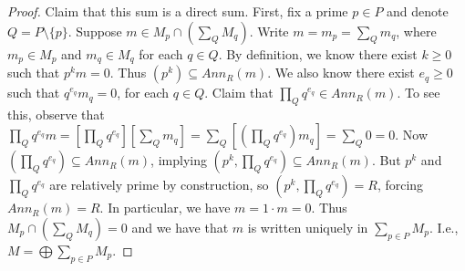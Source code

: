 \documentclass[8pt]{amsart}
\theoremstyle{plain}%
\theoremstyle{definition}
\theoremstyle{remark}
\numberwithin{equation}{section}
\begin{document}
\begin{enumerate}
\begin{proof}
		Claim that this sum is a direct sum. First, fix a prime $p\in P$ and denote $Q = P \setminus \{p\}$. Suppose $m \in M_{p} \cap (\sum_Q M_q)$. Write $m = m_{p} = \sum_Qm_q$, where $m_{p} \in M_{p}$ and $m_q \in M_q$ for each $q \in Q$. By definition, we know there exist $k \geq 0$ such that $p^km = 0$. Thus $(p^k) \subseteq Ann_R(m)$. We also know there exist $e_q \geq 0$ such that $q^{e_q}m_q = 0$, for each $q \in Q$. Claim that $\prod_Q q^{e_q} \in Ann_R(m)$. To see this, observe that $\prod_Qq^{e_q}m = [\prod_Qq^{e_q}][\sum_Qm_q] = \sum_Q[(\prod_Qq^{e_q})m_q] = \sum_Q 0 = 0$. Now $(\prod_Q q^{e_q}) \subseteq Ann_R(m)$, implying $(p^k, \prod_Q q^{e_q}) \subseteq Ann_R(m)$. But $p^k$ and $\prod_Q q^{e_q}$ are relatively prime by construction, so $(p^k, \prod_Q q^{e_q}) = R$, forcing $Ann_R(m) = R$. In particular, we have $m = 1\cdot m = 0$. Thus $M_{p} \cap (\sum_Q M_q) = 0$ and we have that $m$ is written uniquely in $\sum_{p \in P} M_p$. I.e., $M = \bigoplus\sum_{p \in P} M_p$. 
		
		\end{proof}
		
	\end{enumerate}
\end{document}
